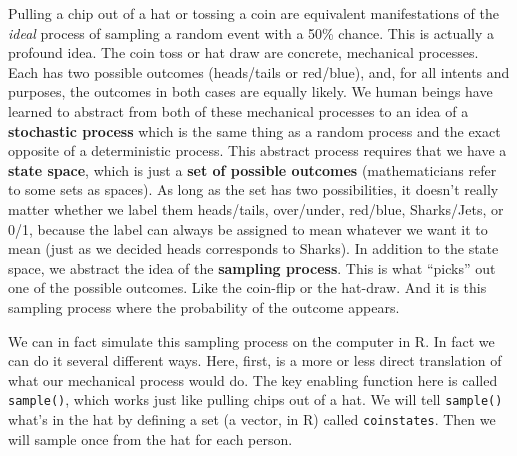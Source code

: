 \documentclass[openany]{book}
\begin{document}
Pulling a chip out of a hat or tossing a coin are equivalent manifestations of the \emph{ideal} process of sampling a random event with a 50\% chance. This is actually a profound idea. The coin toss or hat draw are concrete, mechanical processes. Each has two possible outcomes (heads/tails or red/blue), and, for all intents and purposes, the outcomes in both cases are equally likely. We human beings have learned to abstract from both of these mechanical processes to an idea of a \textbf{stochastic process} which is the same thing as a random process and the exact opposite of a deterministic process. This abstract process requires that we have a \textbf{state space}, which is just a \textbf{set of possible outcomes} (mathematicians refer to some sets as spaces). As long as the set has two possibilities, it doesn't really matter whether we label them heads/tails, over/under, red/blue, Sharks/Jets, or 0/1, because the label can always be assigned to mean whatever we want it to mean (just as we decided heads corresponds to Sharks). In addition to the state space, we abstract the idea of the \textbf{sampling process}. This is what ``picks'' out one of the possible outcomes. Like the coin-flip or the hat-draw. And it is this sampling process where the probability of the outcome appears.

We can in fact simulate this sampling process on the computer in R. In fact we can do it several different ways. Here, first, is a more or less direct translation of what our mechanical process would do. The key enabling function here is called \texttt{sample()}, which works just like pulling chips out of a hat. We will tell \texttt{sample()} what's in the hat by defining a set (a vector, in R) called \texttt{coinstates}. Then we will sample once from the hat for each person.
\end{document}
